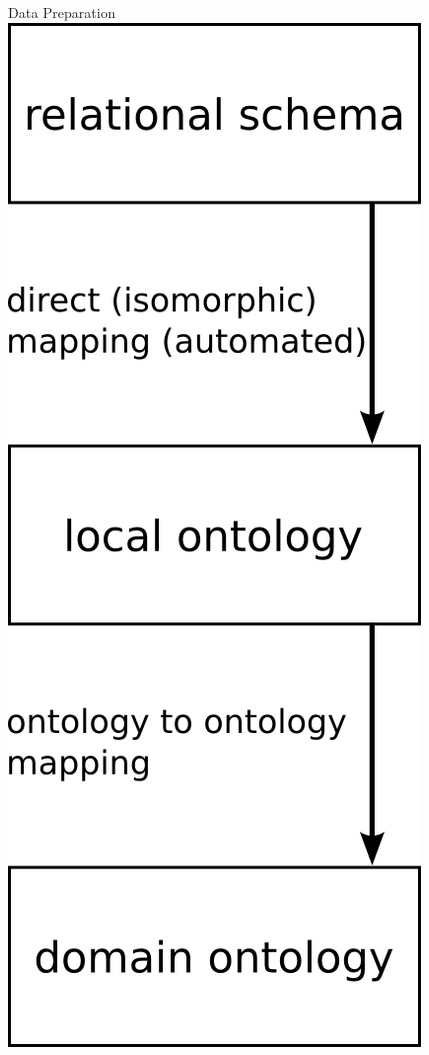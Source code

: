 \documentclass{beamer}
\begin{document}
\begin{frame}{Data Preparation}
\includegraphics[width=\textwidth,height=.88\textheight,keepaspectratio]{g0}
\end{frame}
\end{document}
